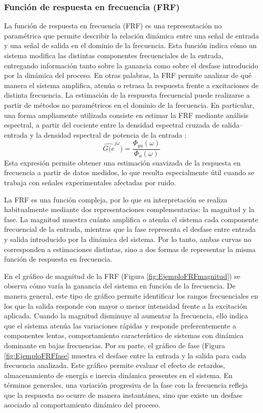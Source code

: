 \documentclass[11pt]{report}
\begin{document}
\subsubsection{Función de respuesta en frecuencia (FRF)}

La función de respuesta en frecuencia (FRF) es una representación no paramétrica que permite describir la relación dinámica entre una señal de entrada y una señal de salida en el dominio de la frecuencia. Esta función indica cómo un sistema modifica las distintas componentes frecuenciales de la entrada, entregando información tanto sobre la ganancia como sobre el desfase introducido por la dinámica del proceso. En otras palabras, la FRF permite analizar de qué manera el sistema amplifica, atenúa o retrasa la respuesta frente a excitaciones de distinta frecuencia.
La estimación de la respuesta frecuencial puede realizarse a partir de métodos no paramétricos en el dominio de la frecuencia. En particular, una forma ampliamente utilizada consiste en estimar la FRF mediante análisis espectral, a partir del cociente entre la densidad espectral cruzada de salida–entrada y la densidad espectral de potencia de la entrada \cite{ljung1999system}:
\begin{equation} \label{frf} 
\hat{G(e}^{j\omega})=\frac{\Phi_{yu}(\omega)}{\Phi_{u}(\omega)}
\end{equation}
Esta expresión permite obtener una estimación suavizada de la respuesta en frecuencia a partir de datos medidos, lo que resulta especialmente útil cuando se trabaja con señales experimentales afectadas por ruido.

La FRF es una función compleja, por lo que su interpretación se realiza habitualmente mediante dos representaciones complementarias: la magnitud y la fase. La magnitud muestra cuánto amplifica o atenúa el sistema cada componente frecuencial de la entrada, mientras que la fase representa el desfase entre entrada y salida introducido por la dinámica del sistema. Por lo tanto, ambas curvas no corresponden a estimaciones distintas, sino a dos formas de representar la misma función de respuesta en frecuencia.

En el gráfico de magnitud de la FRF (Figura \ref{fig:EjemploFRFmagnitud}) se observa cómo varía la ganancia del sistema en función de la frecuencia. De manera general, este tipo de gráfico permite identificar los rangos frecuenciales en los que la salida responde con mayor o menor intensidad frente a la excitación aplicada. Cuando la magnitud disminuye al aumentar la frecuencia, ello indica que el sistema atenúa las variaciones rápidas y responde preferentemente a componentes lentas, comportamiento característico de sistemas con dinámica dominante en bajas frecuencias. Por su parte, el gráfico de fase (Figura \ref{fig:EjemploFRFfase} muestra el desfase entre la entrada y la salida para cada frecuencia analizada. Este gráfico permite evaluar el efecto de retardos, almacenamiento de energía e inercia dinámica presentes en el sistema. En términos generales, una variación progresiva de la fase con la frecuencia refleja que la respuesta no ocurre de manera instantánea, sino que existe un desfase asociado al comportamiento dinámico del proceso.
\end{document}
